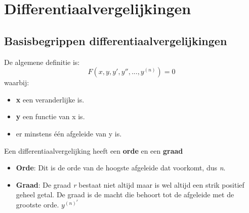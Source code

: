 \chapter{Differentiaalvergelijkingen}
\section{Basisbegrippen differentiaalvergelijkingen}
De algemene definitie is:
$$F(x, y, y', y'', ..., y^{(n)}) = 0$$
waarbij: \begin{itemize}
\item \textbf{x} een veranderlijke is.
\item \textbf{y} een functie van x is.
\item er minstens één afgeleide van y is.
\end{itemize}

Een differentiaalvergelijking heeft een \textbf{orde} en een \textbf{graad}
\begin{itemize}
    \item \textbf{Orde}: Dit is de orde van de hoogste afgeleide dat voorkomt, dus \textit{n}.
    \item \textbf{Graad}: De graad \textit{r} bestaat niet altijd maar is wel altijd een strik positief geheel getal. De graad is de macht die behoort tot de afgeleide met de grootste orde. $y^{(n)^{r}}$
\end{itemize}

